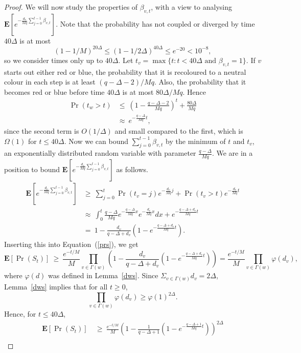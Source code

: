 \documentclass[11pt]{article}
\theoremstyle{definition}
\theoremstyle{remark}
\newcommand{\e}{\mathbf{E}}
\begin{document}
\begin{proof}
We will now study the properties of $\beta_{v,t}$, with a view to analysing
$\e[e^{- \frac{ d_v}{Mq}\sum_{j=0}^{t-1}\beta_{v,t}}]$. Note that the
probability has not coupled or diverged by time $40\Delta$
is at most%
\[(1-1/M)^{20\Delta}\leq (1-1/2\Delta)^{40\Delta} \leq e^{-20}< 10^{-8},\]
so we consider times only up to $40\Delta$. Let $t_v = \max \{t:t< 40\Delta
\textrm{ and }\beta_{v,t}=1\}$. If $v$ starts out either red or blue, the
probability that it is recoloured to a neutral colour in each step is at
least $(q-\Delta-2)/Mq$. Also, the probability that it becomes red or blue
before time $40\Delta$ is at most $80\Delta/Mq$. Hence
\begin{align*}
\Pr(t_w > t ) &\leq\ \left( 1- \frac{q-\Delta-2}{Mq}\right)^t + \frac {80\Delta}{Mq}\\
& \approx\ e^{-\frac{q-\Delta}{Mq}t},
\end{align*}
since the second term is $O(1/\Delta)$ and small compared to the first,
which is $\Omega(1)$ for $t\leq 40\Delta$. Now we can bound
$\sum_{j=0}^{t-1}\beta_{v,t}$ by the minimum of $t$ and $t_v$, an
exponentially distributed random variable with parameter
$\frac{q-\Delta}{Mq}$. We are in a position to bound $\e[e^{- \frac{
d_v}{Mq}\sum_{j=0}^{t-1}\beta_{v,t}}]$ as follows.
\begin{align*}
\e[e^{- \frac{ d_v}{Mq}\sum_{j=0}^{t-1}\beta_{v,t}}] & \geq
\ \sum_{j=0}^{t} \Pr(t_v=j)e^{-\frac{ d_v}{Mq}j} + \Pr(t_v > t )
e^{-\frac{ d_v}{Mq}t}\\
&\approx \ \int_{0}^{t} \frac{q-\Delta}{Mq}e^{- \frac{q-\Delta}{Mq}x}
e^{-\frac{d_v}{Mq} x} dx + e^{- \frac{q-\Delta+d_v}{Mq}t}\\
&=\ 1- \frac{d_v}{q-\Delta+d_v}\left(1-e^{-\frac{q-\Delta+d_v}{Mq}
t}\right).
\end{align*}
Inserting this into Equation~(\ref{prs}), we get
\[\e[\Pr(S_t)]\ \geq\ \frac{e^{-t/M}}{M}\prod_{v\in\Gamma(w)}
\left(1- \frac{d_v}{q-\Delta+d_v}\left(1-e^{-\frac{q-\Delta+d_v}{Mq}
t}\right)\right)=\frac{e^{-t/M}}{M}\prod_{v\in \Gamma(w)} \varphi(d_v),\]%
where $ \varphi(d)$ was defined in Lemma~\ref{dws}. Since $\Sigma_{v\in \Gamma(w)}d_v=2\Delta$, Lemma~\ref{dws} implies that for all $t\geq 0$,
\[ \prod_{v\in \Gamma(w)} \varphi(d_v) \geq
\varphi(1)^{2\Delta}.\]
Hence, for $t \leq 40\Delta$,
\begin{align*}
\e[\Pr(S_t)]\ &\geq\ \frac{e^{-t/M}}{M} \left(1- \frac{1}{q-\Delta+1}\left(1-e^{-\frac{q-\Delta+1}{Mq} t}\right)\right)^{2\Delta}\\

\end{align*}
\end{proof}
\end{document}
